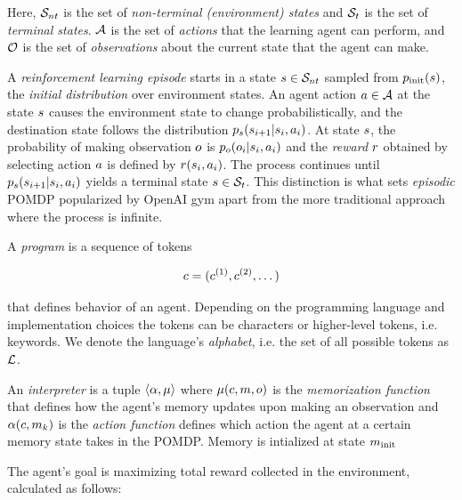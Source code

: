 Here, $\mathcal{S}_{nt}$ is the set of {\em non-terminal (environment) states} and $\mathcal{S}_t$ is the set of {\em terminal states}. 
$\mathcal{A}$ is the set of {\em actions} that the learning agent can perform, and $\mathcal{O}$ is the set of {\em observations} about the current state that the agent can make. 

A \emph{reinforcement learning episode} starts in a state $s \in \mathcal{S}_{nt}$ sampled from $p_\text{init}(s)$, the {\em initial distribution} over environment states.
An agent action $a \in \mathcal{A}$ at the state $s$ causes the environment state to change probabilistically, and the destination state follows the distribution $p_s(s_{i+1} | s_i, a_i)$. 
At state $s$, the probability of making observation $o$ is $p_o(o_i | s_i, a_i)$ and the \emph{reward} $r$ obtained by selecting action $a$ is defined by $r(s_i,a_i)$. 
The process continues until $p_s(s_{i+1} | s_i, a_i)$ yields a terminal state $s \in \mathcal{S}_t$.
This distinction is what sets \emph{episodic} POMDP popularized by OpenAI gym \cite{openai-gym} apart from the more traditional approach \cite{kramerjdavidrPartiallyObservableMarkov1964, spaanPartiallyObservableMarkov2012} where the process is infinite.

A \emph{program} is a sequence of tokens

\begin{equation}
    c=(c^{(1)},c^{(2)},\dots)
\end{equation}

that defines behavior of an agent.
Depending on the programming language and implementation choices the tokens can be characters or higher-level tokens, i.e. keywords.
We denote the language's \emph{alphabet}, i.e. the set of all possible tokens as $\mathcal{L}$.

An \emph{interpreter} is a tuple $\langle \alpha,\mu \rangle$ where $\mu(c,m,o)$ is the \emph{memorization function} that defines how the agent's memory updates upon making an observation and $\alpha(c, m_k)$ is the \emph{action function} defines which action the agent at a certain memory state takes in the POMDP.
Memory is intialized at state $m_\text{init}$

The agent's goal is maximizing total reward collected in the environment, calculated as follows:

